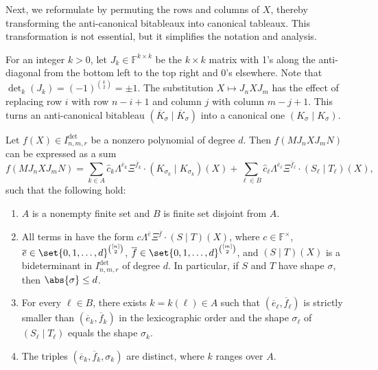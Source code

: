\documentclass[10pt,a4paper]{amsart}
\newcommand*\F{\mathbb{F}}
\begin{document}
Next, we reformulate  by permuting the rows and columns of $X$, thereby transforming the anti-canonical bitableaux into canonical tableaux.
This transformation is not essential, but it simplifies the notation and analysis.

For an integer $k>0$, let $J_{k}\in\F^{k\times k}$ be the $k\times k$ matrix with 1’s along the anti-diagonal from the bottom left to the top right and 0’s elsewhere.
Note that $\det_{k}(J_k) = (-1)^{\binom{k}{2}} = \pm 1$.
The substitution $X\mapsto J_{n} X J_{m}$ has the effect of replacing row $i$ with row $n-i+1$ and column $j$ with column $m-j+1$.
This turns an anti-canonical bitableau $(\overline{K}_\sigma\mid \overline{K}_\sigma)$ into a canonical one $(K_\sigma\mid K_\sigma)$.
\begin{cor}\label{cor:reformuated}
    Let $f(X) \in I^{\det}_{n, m, r}$ 
    be a nonzero polynomial of degree $d$.
    Then $f(M J_n X J_m N)$ can be expressed as a sum
    \begin{equation}\label{eq:expansion3}
            f(M J_n X J_m N) = \sum_{k \in A} \widehat{c}_{k} \Lambda^{\overline{e}_k}\Xi^{\overline{f}_k}\cdot (K_{\sigma_k}\mid K_{\sigma_k})(X) + \sum_{\ell \in B} \widehat{c}_{\ell} \Lambda^{\overline{e}_\ell}\Xi^{\overline{f}_\ell}\cdot (S_\ell\mid T_\ell)(X),
        \end{equation}
    such that the following hold:
    \begin{enumerate}
        \item\label{item:expansion3_i0} $A$ is a nonempty finite set and $B$ is finite set disjoint from $A$.
        \item\label{item:expansion3_i1} All terms in  have the form $c \Lambda^{\overline{e}}\Xi^{\overline{f}}\cdot (S\mid T)(X)$, where $c\in \F^\times$, $\overline{e}\in \set{0,1,\dots,d }^{\binom{[n]}{2}}$, $\overline{f}\in \set{0,1,\dots,d}^{\binom{[m]}{2}}$,
        and $(S\mid T)(X)$ is a bideterminant in $I^{\det}_{n, m, r}$ of degree $d$.
        In particular, if $S$ and $T$ have shape $\sigma$, then $\abs{\sigma} \leq d$.
        \item\label{item:expansion3_i1.5} For every $\ell\in B$, there exists $k=k(\ell)\in A$ such that $(\overline{e}_\ell, \overline{f}_\ell)$ is strictly smaller than $(\overline{e}_k,\overline{f}_k)$ in the lexicographic order and the shape $\sigma_\ell$ of $(S_\ell\mid T_\ell)$ equals the shape $\sigma_k$.
        \item\label{item:expansion3_i2} The triples $(\overline{e}_k,\overline{f}_k,\sigma_k)$ are distinct, where $k$ ranges over $A$.
    \end{enumerate} 
\end{cor}
\end{document}
